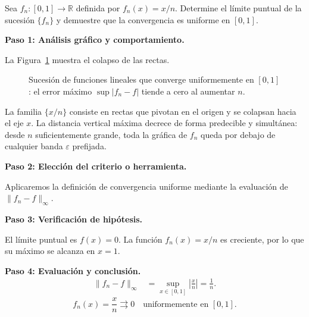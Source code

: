 \begin{example}
Sea $f_n\colon[0,1]\to\mathbb{R}$ definida por $f_n(x)=x/n$.
Determine el límite puntual de la sucesión $\{f_n\}$ y demuestre que
la convergencia es uniforme en $[0,1]$.

\begin{myproof}
\textbf{Paso 1: Análisis gráfico y comportamiento.}

La Figura~\ref{fig:ssf_colapso_rectas} muestra el colapso de las rectas.

\begin{figure}[H]
\centering
{}
\caption{Sucesión de funciones lineales que converge uniformemente en $[0,1]$: el error máximo $\sup|f_n-f|$ tiende a cero al aumentar $n$.}
\label{fig:ssf_colapso_rectas}
\end{figure}

La familia $\{x/n\}$ consiste en rectas que pivotan en el origen y se
colapsan hacia el eje $x$. La distancia vertical máxima decrece de
forma predecible y simultánea: desde $n$ suficientemente grande,
toda la gráfica de $f_n$ queda por debajo de cualquier banda
$\varepsilon$ prefijada.

\textbf{Paso 2: Elección del criterio o herramienta.}

Aplicaremos la definición de convergencia uniforme mediante la
evaluación de $\|f_n - f\|_\infty$.

\textbf{Paso 3: Verificación de hipótesis.}

El límite puntual es $f(x) = 0$. La función $f_n(x) = x/n$ es
creciente, por lo que su máximo se alcanza en $x=1$.

\textbf{Paso 4: Evaluación y conclusión.}
\begin{align*}
    \|f_n - f\|_\infty
        &= \sup_{x\in[0,1]} \left| \frac{x}{n} \right|
         = \frac{1}{n}.
\end{align*}
\[
    \boxed{f_n(x) = \frac{x}{n}
        \rightrightarrows 0 \quad \text{uniformemente en } [0,1].}
\]
\end{myproof}
\end{example}

